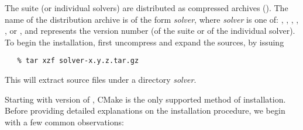 The {\sundials} suite (or individual solvers) are distributed as
compressed archives (). The name of the distribution
archive is of the form {\em solver}, where {\em
solver} is one of: , , , ,
, or , and  represents the version number
(of the {\sundials} suite or of the individual solver).
To begin the installation, first uncompress and expand the sources, by issuing
\begin{verbatim}
   % tar xzf solver-x.y.z.tar.gz
\end{verbatim}
This will extract source files under a directory {\em solver}.

Starting with version  of {\sundials}, CMake is the only supported method
of installation.
Before providing detailed explanations on the installation procedure, we begin with a few common observations:

